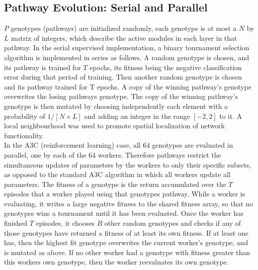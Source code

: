 \documentclass{sig-alternate-05-2015}
\begin{document}
\subsection{Pathway Evolution: Serial and Parallel} 
\(P\) genotypes (pathways) are initialized randomly, each genotype is at most a \(N\) by \(L\) matrix of integers, which describe the active modules in each layer in that pathway. In the serial supervised implementation, a binary tournament selection algorithm is implemented in series as follows. A random genotype is chosen, and its pathway is trained for \(T\) epochs, its fitness being the negative classification error during that period of training. Then another random genotype is chosen and its pathway trained for T epochs. A copy of the winning pathway's genotype overwrites the losing pathways genotype. The copy of the winning pathway's genotype is then mutated by choosing independently each element with a probability of \(1/[N\times L]\) and adding an integer in the range \([-2, 2]\) to it.  A local neighbourhood was used to promote spatial localization of network functionality. \\

In the A3C (reinforcement learning) case, all 64 genotypes are evaluated in parallel, one by each of the 64 workers. Therefore pathways restrict the simultaneous updates of parameters by the workers to only their specific subsets, as opposed to the standard A3C algorithm in which all workers update all parameters. The fitness of a genotype is the return accumulated over the \(T\) episodes that a worker played using that genotypes pathway. While a worker is evaluating, it writes a large negative fitness to the shared fitness array, so that no genotypes wins a tournament until it has been evaluated. Once the worker has finished \(T\) episodes, it chooses \(B\) other random genotypes and checks if any of those genotypes have returned a fitness of at least its own fitness. If at least one has, then the highest fit genotype overwrites the current worker's genotype, and is mutated as above.  If no other worker had a genotype with fitness greater than this workers own genotype, then the worker reevaluates its own genotype. 
\end{document}
